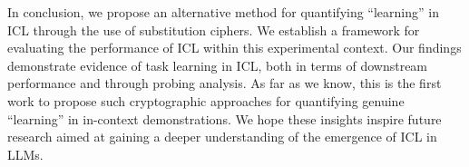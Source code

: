 \documentclass[11pt]{article}
\begin{document}







In conclusion, we propose an alternative method for quantifying ``learning'' in ICL through the use of substitution ciphers. We establish a framework for evaluating the performance of ICL within this experimental context. Our findings demonstrate evidence of task learning in ICL, both in terms of downstream performance and through probing analysis.
As far as we know, this is the first work to propose such cryptographic approaches for quantifying genuine ``learning'' in in-context demonstrations.
We hope these insights inspire future research aimed at gaining a deeper understanding of the emergence of ICL in LLMs.


\end{document}

